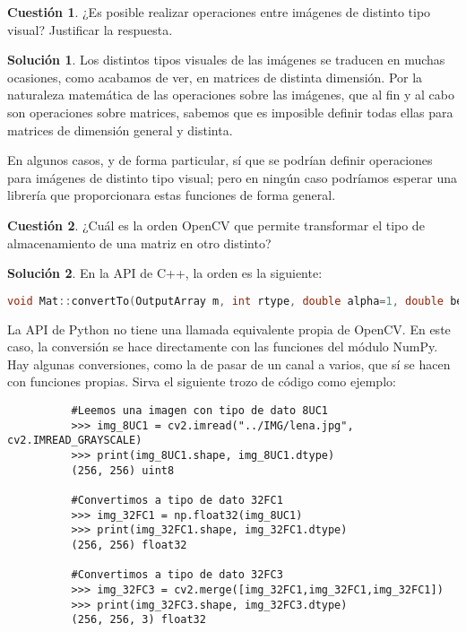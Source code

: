\documentclass[a4paper, 11pt]{article}
\theoremstyle{definition}
\newtheorem{cuestion}{Cuestión}
\newtheorem*{solucion}{Solución}
\begin{document}
  \begin{cuestion}
      ¿Es posible realizar operaciones entre imágenes de distinto tipo visual? Justificar la respuesta.
  \end{cuestion}

  \begin{solucion}
      Los distintos tipos visuales de las imágenes se traducen en muchas ocasiones, como acabamos de ver, en matrices de distinta dimensión. Por la naturaleza matemática de las operaciones sobre las imágenes, que al fin y al cabo son operaciones sobre matrices, sabemos que es imposible definir todas ellas para matrices de dimensión general y distinta.

      En algunos casos, y de forma particular, sí que se podrían definir operaciones para imágenes de distinto tipo visual; pero en ningún caso podríamos esperar una librería que proporcionara estas funciones de forma general.
  \end{solucion}

  \begin{cuestion}
      ¿Cuál es la orden OpenCV que permite transformar el tipo de almacenamiento de una matriz en otro distinto?
  \end{cuestion}

  \begin{solucion}
      En la API de C++, la orden es la siguiente:
      \begin{lstlisting}[language=C++]
          void Mat::convertTo(OutputArray m, int rtype, double alpha=1, double beta=0) const
      \end{lstlisting}

      La API de Python no tiene una llamada equivalente propia de OpenCV. En este caso, la conversión se hace directamente con las funciones del módulo NumPy. Hay algunas conversiones, como la de pasar de un canal a varios, que sí se hacen con funciones propias. Sirva el siguiente trozo de código como ejemplo:

      \begin{lstlisting}
          #Leemos una imagen con tipo de dato 8UC1
          >>> img_8UC1 = cv2.imread("../IMG/lena.jpg", cv2.IMREAD_GRAYSCALE)
          >>> print(img_8UC1.shape, img_8UC1.dtype)
          (256, 256) uint8

          #Convertimos a tipo de dato 32FC1
          >>> img_32FC1 = np.float32(img_8UC1)
          >>> print(img_32FC1.shape, img_32FC1.dtype)
          (256, 256) float32

          #Convertimos a tipo de dato 32FC3
          >>> img_32FC3 = cv2.merge([img_32FC1,img_32FC1,img_32FC1])
          >>> print(img_32FC3.shape, img_32FC3.dtype)
          (256, 256, 3) float32
      \end{lstlisting}
  \end{solucion}
\end{document}
